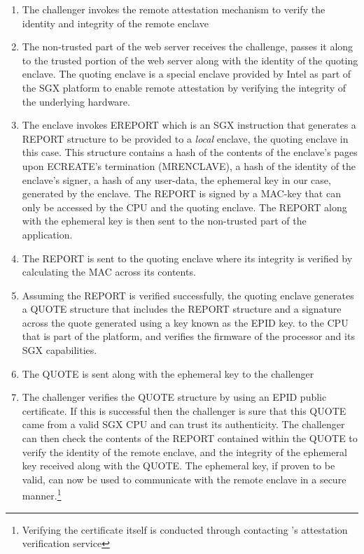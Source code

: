 \documentclass[../main.tex]{subfiles}
\begin{document}
\begin{enumerate}
  \item The challenger invokes the remote attestation mechanism to
    verify the identity and integrity of the remote enclave
  \item The non-trusted part of the web server receives the challenge,
    passes it along to the trusted portion of the web server along with
    the identity of the quoting enclave. The quoting enclave is a special
    enclave provided by Intel as part of the SGX platform to enable remote
    attestation by verifying the integrity of the underlying
    hardware. %
  \item The enclave invokes EREPORT which is an SGX instruction that
    generates a REPORT structure to be provided to a \textit{local}
    enclave, the quoting enclave in this case.  This structure contains a
    hash of the contents of the enclave's pages upon ECREATE's termination
    (MRENCLAVE), a hash of the identity of the enclave's signer, a hash of
    any user-data, the ephemeral key in our case, generated by the
    enclave. The REPORT is signed by a MAC-key that can only be accessed
    by the CPU and the quoting enclave. The REPORT along with the
    ephemeral key is then sent to the non-trusted part of the application.
  \item The REPORT is sent to the quoting enclave where its integrity
    is verified by calculating the MAC across its contents.
  \item Assuming the REPORT is verified successfully, the quoting
    enclave generates a QUOTE structure that includes the REPORT structure
    and a signature across the quote generated using a key known as the
    EPID key. %
    to the CPU that is part of the platform, and verifies the firmware of
    the processor and its SGX capabilities.
  \item The QUOTE is sent along with the ephemeral key to the
    challenger
  \item The challenger verifies the QUOTE structure by using an EPID
    public certificate. If this is successful then the challenger is sure
    that this QUOTE came from a valid SGX CPU and can trust its
    authenticity. The challenger can then check the contents of the REPORT
    contained within the QUOTE to verify the identity of the remote
    enclave, and the integrity of the ephemeral key received along with
    the QUOTE. The ephemeral key, if proven to be valid, can now be used
    to communicate with the remote enclave in a secure
    manner.\footnote{Verifying the certificate itself is conducted through
    contacting \Intel's attestation verification service}
\end{enumerate}
		
\end{document}
